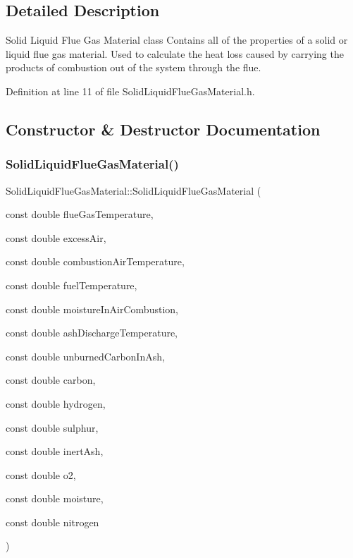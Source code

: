 \subsection{Detailed Description}
Solid Liquid Flue Gas Material class Contains all of the properties of a solid or liquid flue gas material. Used to calculate the heat loss caused by carrying the products of combustion out of the system through the flue. 

Definition at line 11 of file Solid\+Liquid\+Flue\+Gas\+Material.\+h.



\subsection{Constructor \& Destructor Documentation}
\mbox{\label{class_solid_liquid_flue_gas_material_a91e7c5e670b3db4fedcbc494448644d5}} 
\subsubsection{\texorpdfstring{Solid\+Liquid\+Flue\+Gas\+Material()}{SolidLiquidFlueGasMaterial()}\hspace{0.1cm}{\footnotesize\ttfamily [1/3]}}
{\footnotesize\ttfamily Solid\+Liquid\+Flue\+Gas\+Material\+::\+Solid\+Liquid\+Flue\+Gas\+Material (\begin{DoxyParamCaption}\item[{const double}]{flue\+Gas\+Temperature,  }\item[{const double}]{excess\+Air,  }\item[{const double}]{combustion\+Air\+Temperature,  }\item[{const double}]{fuel\+Temperature,  }\item[{const double}]{moisture\+In\+Air\+Combustion,  }\item[{const double}]{ash\+Discharge\+Temperature,  }\item[{const double}]{unburned\+Carbon\+In\+Ash,  }\item[{const double}]{carbon,  }\item[{const double}]{hydrogen,  }\item[{const double}]{sulphur,  }\item[{const double}]{inert\+Ash,  }\item[{const double}]{o2,  }\item[{const double}]{moisture,  }\item[{const double}]{nitrogen }\end{DoxyParamCaption})\hspace{0.3cm}{\ttfamily [inline]}}

